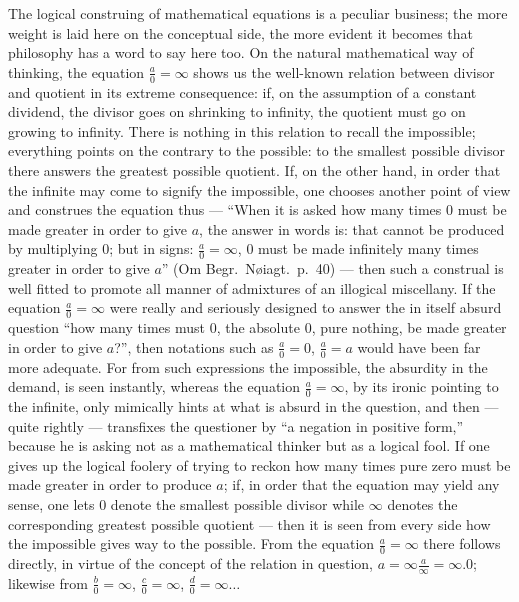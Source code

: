 \documentclass[12pt,a4paper]{book}
\begin{document}
The logical construing of mathematical equations is a peculiar business; the
more weight is laid here on the conceptual side, the more evident it becomes
that philosophy has a word to say here too. On the natural mathematical way of
thinking, the equation $\frac{a}{0} = \infty$ shows us the well-known relation
between
divisor and quotient in its extreme consequence: if, on the assumption of a
constant dividend, the divisor goes on shrinking to infinity, the quotient must
go on growing to infinity. There is nothing in this relation to recall the
impossible; everything points on the contrary to the possible: to the smallest
possible divisor there answers the greatest possible quotient. If, on the other
hand, in order that the infinite may come to signify the impossible, one
chooses another point of view and construes the equation thus --- ``When it is
asked how many times $0$ must be made greater in order to give $a$, the answer
in words is: that cannot be produced by multiplying $0$; but in signs:
$\frac{a}{0} = \infty$, $0$ must be made infinitely many times greater in order
to give $a$'' (Om Begr.\ Nøiagt.\ p.~40) --- then such a construal is well
fitted to promote all manner of admixtures of an illogical miscellany. If the
equation $\frac{a}{0} = \infty$ were really and seriously designed to answer
the in itself absurd question ``how many times must $0$, the absolute $0$, pure
nothing, be made greater in order to give $a$?'', then notations such as
$\frac{a}{0} = 0$, $\frac{a}{0} = a$ would have been far more adequate. For
from such expressions the impossible, the absurdity in the demand, is seen
instantly, whereas the equation $\frac{a}{0} = \infty$, by its ironic pointing
to the infinite, only mimically hints at what is absurd in the question, and
then --- quite rightly --- transfixes the questioner by ``a negation in
positive form,'' because he is asking not as a mathematical thinker but as a
logical fool. If one gives up the logical foolery of trying to reckon how many
times pure zero must be made greater in order to produce $a$; if, in order that
the equation may yield any sense, one lets $0$ denote the smallest possible
divisor while $\infty$ denotes the corresponding greatest possible quotient ---
then it is seen from every side
how the impossible gives way to the possible. From the equation $\frac{a}{0} =
\infty$ there follows directly, in virtue of the concept of the relation in
question, $a = \infty \frac{a}{\infty} = \infty.0$; likewise from
$\frac{b}{0} = \infty$, $\frac{c}{0} = \infty$, $\frac{d}{0} = \infty\ldots$
\end{document}
